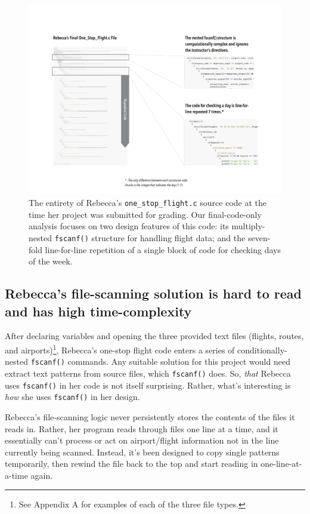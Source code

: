 \begin{figure}[htbp]
\centering
\includegraphics{RebeccasCode/OneStopFlightSupergraphic.pdf}
\caption{The entirety of Rebecca's \texttt{one\_stop\_flight.c} source code at the time her project was submitted for grading. Our final-code-only analysis focuses on two design features of this code: its multiply-nested \texttt{fscanf()} structure for handling flight data; and the seven-fold line-for-line repetition of a single block of code for checking days of the week.}
\end{figure}

\subsection{Rebecca's file-scanning solution is hard to read and has high time-complexity}\label{rebeccas-file-scanning-solution-is-hard-to-read-and-has-high-time-complexity}

After declaring variables and opening the three provided text files (flights, routes, and airports)\footnote{See Appendix A for examples of each of the three file types.}, Rebecca's one-stop flight code enters a series of conditionally-nested \texttt{fscanf()} commands. Any suitable solution for this project would need extract text patterns from source files, which \texttt{fscanf()} does. So, \emph{that} Rebecca uses \texttt{fscanf()} in her code is not itself surprising. Rather, what's interesting is \emph{how} she uses \texttt{fscanf()} in her design.

Rebecca's file-scanning logic never persistently stores the contents of the files it reads in. Rather, her program reads through files one line at a time, and it essentially can't process or act on airport/flight information not in the line currently being scanned. Instead, it's been designed to copy single patterns temporarily, then rewind the file back to the top and start reading in one-line-at-a-time again.

